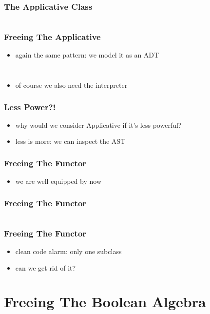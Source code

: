 \documentclass{beamer}
\begin{document}
\begin{frame}[fragile]
  \frametitle{The Applicative Class}
  \inputminted{scala}{snippets/applicative-typeclass.scala}
\end{frame}

\begin{frame}[fragile]
  \frametitle{Freeing The Applicative}
  \begin{itemize}
  \item again the same pattern: we model it as an ADT
  \end{itemize}
    \inputminted{scala}{snippets/free-applicative.scala}
  \begin{verbatim}
\end{verbatim}
\begin{itemize}
\item of course we also need the interpreter
\end{itemize}
\end{frame}

\begin{frame}
  \frametitle{Less Power?!}
  \begin{itemize}
  \item why would we consider Applicative if it's less powerful?
  \item less is more: we can inspect the AST
  \end{itemize}
\end{frame}

\begin{frame}[fragile]
  \frametitle{Freeing The Functor}
  \begin{itemize}
  \item we are well equipped by now
  \end{itemize}
\end{frame}

\begin{frame}[fragile]
  \frametitle{Freeing The Functor}
  \inputminted{scala}{snippets/free-functor.scala}
\end{frame}

\begin{frame}[fragile]
  \frametitle{Freeing The Functor}
  \begin{itemize}
  \item clean code alarm: only one subclass
  \item can we get rid of it?
  \end{itemize}
\end{frame}

\section{Freeing The Boolean Algebra}\label{sec:free-boolean-algebra}
\end{document}
